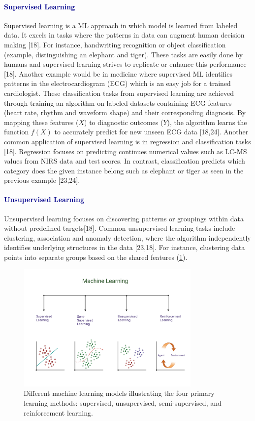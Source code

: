 \documentclass[12pt,a4paper]{report}
\begin{document}
\paragraph{\textcolor{darkblue}{Supervised Learning}} 
Supervised learning is a ML approach in which model is learned from labeled data. It excels in tasks where the patterns in data can augment human decision making [18]. 
For instance, handwriting recognition or object classification (example, distinguishing an elephant and tiger). These tasks are easily done by humans and supervised learning strives to replicate 
or enhance this performance [18]. Another example would be in medicine where supervised ML identifies patterns in the electrocardiogram (ECG) which is an easy job for a trained cardiologist. 
These classification tasks from supervised learning are achieved through training an algorithm on labeled datasets containing ECG features (heart rate, rhythm and waveform shape) and their corresponding diagnosis. 
By mapping these features ($X$) to diagnostic outcomes ($Y$), the algorithm learns the function $f(X)$ to accurately predict for new unseen ECG data [18,24]. Another common application of supervised learning is in regression and classification tasks [18]. 
Regression focuses on predicting continues numerical values such as LC-MS values from NIRS data and test scores. In contrast, classification predicts which category does the given instance belong such as elephant or tiger as seen in the previous example [23,24]. \\

\paragraph{\textcolor{darkblue}{Unsupervised Learning}} 
Unsupervised learning focuses on discovering patterns or groupings within data without predefined targets[18]. Common unsupervised learning tasks include clustering, association and anomaly detection, where the algorithm independently identifies underlying structures in the data [23,18].
For instance, clustering data points into separate groups based on the shared features (\ref{fig:ml}). 

\begin{figure}[h]
    \centering
    \includegraphics[width=0.8\textwidth]{Figures/ml.png} 
    \caption{Different machine learning models illustrating the four primary learning methods: supervised, unsupervised, semi-supervised, and reinforcement learning.}
    \label{fig:ml}
\end{figure}
\end{document}
